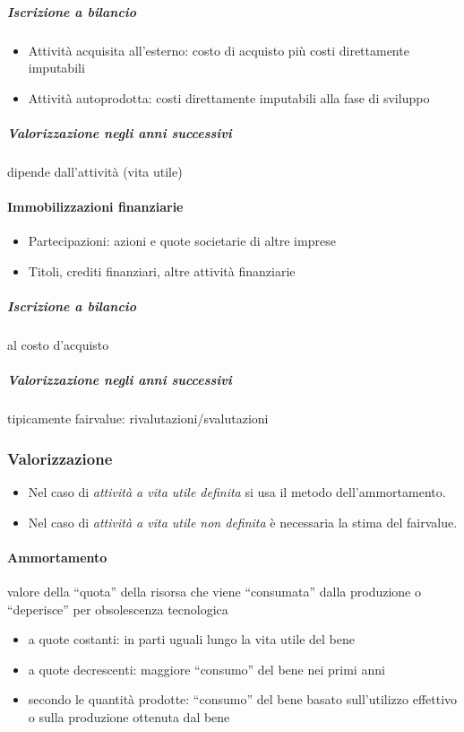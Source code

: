 \subparagraph{Iscrizione a bilancio}
\begin{itemize}
    \item Attività acquisita all’esterno: costo di acquisto più costi direttamente imputabili
    \item Attività autoprodotta: costi direttamente imputabili alla fase di sviluppo
\end{itemize}

\subparagraph{Valorizzazione negli anni successivi} dipende dall’attività (vita utile)

\paragraph{Immobilizzazioni finanziarie}
\begin{itemize}
    \item Partecipazioni: azioni e quote societarie di altre imprese
    \item Titoli, crediti finanziari, altre attività finanziarie
\end{itemize}

\subparagraph{Iscrizione a bilancio} al costo d'acquisto
\subparagraph{Valorizzazione negli anni successivi} tipicamente \gls{fairvalue}:
rivalutazioni/svalutazioni

\subsubsection{Valorizzazione}

\begin{itemize}
    \item Nel caso di \emph{attività a vita utile definita} si usa il metodo dell'ammortamento.
    \item Nel caso di \emph{attività a vita utile non definita} è necessaria la stima del \gls{fairvalue}.
\end{itemize}


\paragraph{Ammortamento} valore della ``quota'' della risorsa che viene ``consumata''
dalla produzione o “deperisce” per obsolescenza tecnologica
\begin{itemize}
    \item a quote costanti: in parti uguali lungo la vita utile del bene
    \item a quote decrescenti: maggiore ``consumo'' del bene nei primi anni
    \item secondo le quantità prodotte: ``consumo'' del bene basato sull’utilizzo
    effettivo o sulla produzione ottenuta dal bene
\end{itemize}


